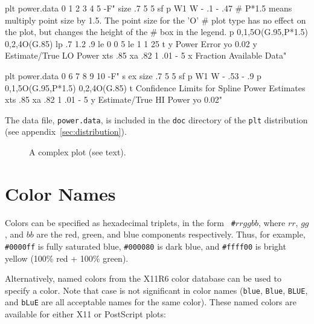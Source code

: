 \documentclass{book}
\begin{document}
\begin{center}
\begin{boxedverbatim}
plt power.data 0 1 2 3 4 5 -F"
size .7 5 5
sf p W1
W - .1 - .47
# P*1.5 means multiply point size by 1.5.  The point size for the 'O'
# plot type has no effect on the plot, but changes the height of the
# box in the legend.
p 0,1,5O(G.95,P*1.5) 0,2,4O(G.85)
lp .7 1.2 .9
le 0 0   5%
le 1 1 25%
t
y Power Error
yo 0.02
y Estimate/True LO Power
xts .85
xa .82 1 .01 - 5
x Fraction Available Data"

plt power.data 0 6 7 8 9 10 -F"
s ex
size .7 5 5
sf p W1
W - .53 - .9
p 0,1,5O(G.95,P*1.5) 0,2,4O(G.85)
t Confidence Limits for Spline Power Estimates
xts .85
xa .82 1 .01 - 5
y Estimate/True HI Power
yo 0.02"
\end{boxedverbatim}
\end{center}

The data file, {\tt power.data}, is included in the {\tt doc} directory of
the {\tt plt} distribution (see appendix~\ref{sec:distribution}).

\begin{figure}
\begin{center}
\end{center}
\caption[A complex plot]{A complex plot (see text). \label{fig:conf}}
\end{figure}

\newpage
\appendix
\chapter{Color Names \label{sec:color-names}}

%
Colors can be specified as hexadecimal triplets, in the form {\tt
\#}$rrggbb$, where $rr$, $gg$, and $bb$ are the red, green, and blue
components respectively.  Thus, for example, {\tt \#0000ff} is fully
saturated blue, {\tt \#000080} is dark blue, and {\tt \#ffff00} is
bright yellow (100\% red + 100\% green).

Alternatively, named colors from the X11R6 color database can be used
to specify a color.  Note that case is not significant in color names
({\tt blue}, {\tt Blue}, {\tt BLUE}, and {\tt bLuE} are all acceptable
names for the same color).  These named colors are available for
either X11 or PostScript plots:
\end{document}
